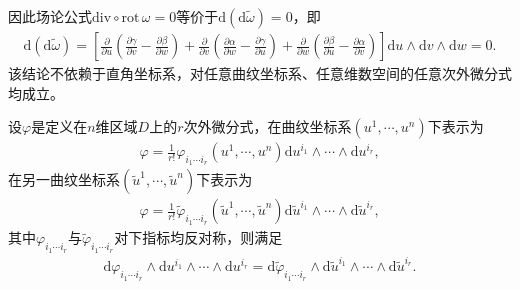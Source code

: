 \documentclass[../../main.tex]{subfiles}%
\begin{document}
\begin{solution}
因此场论公式$\mathrm{div}\circ\mathrm{rot}\,\omega=0$等价于$\mathrm{d}(\mathrm{d}\tilde{\omega})=0$，即
\begin{align*}
\mathrm{d}(\mathrm{d}\tilde{\omega}) = \left[\frac{\partial}{\partial u}\left(\frac{\partial\gamma}{\partial v}-\frac{\partial\beta}{\partial w}\right)+\frac{\partial}{\partial v}\left(\frac{\partial\alpha}{\partial w}-\frac{\partial\gamma}{\partial u}\right)+\frac{\partial}{\partial w}\left(\frac{\partial\beta}{\partial u}-\frac{\partial\alpha}{\partial v}\right)\right]\mathrm{d}u\land\mathrm{d}v\land\mathrm{d}w=0.
\end{align*}
该结论不依赖于直角坐标系，对任意曲纹坐标系、任意维数空间的任意次外微分式均成立。

\end{solution}

\begin{theorem}
设$\varphi$是定义在$n$维区域$D$上的$r$次外微分式，在曲纹坐标系$(u^1,\cdots,u^n)$下表示为
\begin{align*}
\varphi = \frac{1}{r!}\varphi_{i_1\cdots i_r}(u^1,\cdots,u^n)\mathrm{d}u^{i_1}\land\cdots\land\mathrm{d}u^{i_r},
\end{align*}
在另一曲纹坐标系$(\tilde{u}^1,\cdots,\tilde{u}^n)$下表示为
\begin{align*}
\varphi = \frac{1}{r!}\tilde{\varphi}_{i_1\cdots i_r}(\tilde{u}^1,\cdots,\tilde{u}^n)\mathrm{d}\tilde{u}^{i_1}\land\cdots\land\mathrm{d}\tilde{u}^{i_r},
\end{align*}
其中$\varphi_{i_1\cdots i_r}$与$\tilde{\varphi}_{i_1\cdots i_r}$对下指标均反对称，则满足
\begin{align}
\mathrm{d}\varphi_{i_1\cdots i_r}\land\mathrm{d}u^{i_1}\land\cdots\land\mathrm{d}u^{i_r} = \mathrm{d}\tilde{\varphi}_{i_1\cdots i_r}\land\mathrm{d}\tilde{u}^{i_1}\land\cdots\land\mathrm{d}\tilde{u}^{i_r}. \label{eq:exterior-form-invariance}
\end{align}
\end{theorem}
\end{document}
